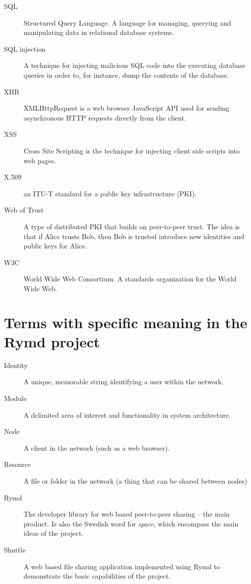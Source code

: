 \begin{description}
  \item[SQL] Structured Query Language. A language for managing, querying and manipulating data in relational database systems.
  \item[SQL injection] A technique for injecting malicious SQL code into the executing database queries in order to, for instance, dump the contents of the database.
  \item[XHR] XMLHttpRequest is a web browser JavaScript API used for sending asynchronous HTTP requests directly from the client.
  \item[XSS] Cross Site Scripting is the technique for injecting client side scripts into web pages.
  \item[X.509] an ITU-T standard for a public key infrastructure (PKI).
  \item[Web of Trust] A type of distributed PKI that builds on peer-to-peer trust. The idea is that if Alice trusts Bob, then Bob is trusted introduce new identities and public keys for Alice.
  \item[W3C] World Wide Web Consortium. A standards organization for the World Wide Web.

\end{description}

\section*{Terms with specific meaning in the Rymd project}
\begin{description}
  \item[Identity] A unique, memorable string identifying a user within the network.
  \item[Module] A delimited area of interest and functionality in system architecture.
  \item[Node] A client in the network (such as a web browser).
  \item[Resource] A file or folder in the network (a thing that can be shared between nodes)
  \item[Rymd] The developer library for web based peer-to-peer sharing – the main product. Is also the Swedish word for \emph{space}, which encompass the main ideas of the project.
  \item[Shuttle] A web based file sharing application implemented using Rymd to demonstrate the basic capabilities of the project.
\end{description}
